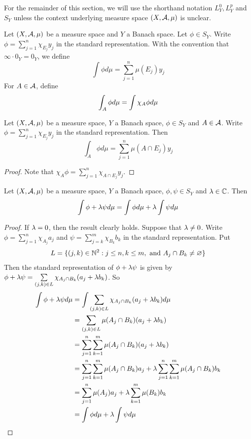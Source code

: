 \documentclass{book}
\begin{document}
	\begin{note}
	For the remainder of this section, we will use the shorthand notation $L^0_Y, L^p_Y$ and $S_Y$ unless the context underlying measure space $(X, \mathcal{A}, \mu)$ is unclear.
	\end{note}
	
	\begin{defn}  
	Let $(X, \mathcal{A}, \mu)$ be a measure space and $Y$ a Banach space. Let $\phi \in S_Y$. Write $\phi = \sum\limits_{j=1}^n\chi_{E_j}y_j$ in the standard representation. With the convention that $\infty \cdot 0_Y = 0_Y$, we define $$\int \phi d\mu = \sum\limits_{j=1}^n \mu(E_j)y_j $$ For $A \in \mathcal{A}$, define  $$\int_A \phi d \mu = \int \chi_A \phi d\mu \\$$
	\end{defn}
	
	\begin{ex}  
	Let $(X, \mathcal{A}, \mu)$ be a measure space, $Y$ a Banach space, $\phi \in S_Y$ and $A \in \mathcal{A}$. Write $\phi = \sum\limits_{j=1}^n\chi_{E_j}y_j$ in the standard representation. Then $$\int_A \phi d\mu = \sum\limits_{j=1}^n \mu(A \cap E_j)y_j$$
	\end{ex}
	
	\begin{proof}
	Note that $\chi_A \phi = \sum\limits_{j=1}^n\chi_{A \cap E_j}y_j$.
	\end{proof}		
	
	\begin{ex}  
	Let $(X, \mathcal{A}, \mu)$ be a measure space, $Y$ a Banach space, $\phi, \psi \in S_Y$ and $\lambda \in \mathbb{C}$. Then $$\int \phi + \lambda \psi d\mu = \int \phi d \mu + \lambda \int \psi d\mu $$
	\end{ex}
	
	\begin{proof}
	If $\lambda =0$, then the result clearly holds. Suppose that $\lambda \neq 0$.	Write $\phi = \sum\limits_{j=1}^n\chi_{A_j}a_j$ and $\psi = \sum\limits_{j=k}^m\chi_{B_k}b_k$ in the standard representation. Put $$L = \{(j,k) \in \mathbb{N}^2: j \leq n, k \leq m, \text{ and } A_j \cap B_k \neq \varnothing\}$$ Then the standard representation of $\phi + \lambda \psi$ is given by  $\phi + \lambda \psi = \sum\limits_{(j,k) \in L} \chi_{A_j \cap B_k}(a_j + \lambda b_k)$.
	So 
	\begin{align*}
	\int \phi + \lambda \psi d \mu 
	&= \int \sum\limits_{(j,k) \in L} \chi_{A_j \cap B_k}(a_j + \lambda b_k) d \mu \\
	&= \sum\limits_{(j,k) \in L} \mu(A_j \cap B_k)(a_j + \lambda b_k) \\
	&= \sum\limits_{j = 1}^n \sum\limits_{k=1}^m \mu(A_j \cap B_k)(a_j + \lambda b_k)  \\ 
	&= \sum\limits_{j = 1}^n \sum\limits_{k=1}^m \mu(A_j \cap B_k)a_j + \lambda \sum\limits_{j = 1}^n \sum\limits_{k=1}^m \mu(A_j \cap B_k) b_k \\
	&= \sum\limits_{j = 1}^n \mu(A_j)a_j +  \lambda\sum\limits_{k=1}^m \mu(B_k) b_k \\
	&= \int \phi d \mu + \lambda \int \psi d\mu 
	\end{align*}
	\end{proof}
\end{document}
